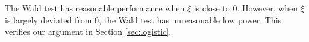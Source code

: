 \documentclass[11pt]{article}
\newcommand{\myT}{\intercal}
\theoremstyle{plain}
\theoremstyle{definition}
\theoremstyle{remark}
\begin{document}
The Wald test has reasonable performance when $\xi$ is close to $0$.
However, when $\xi$ is largely deviated from $0$, the Wald test has unreasonable low power.
This verifies our argument in Section \ref{sec:logistic}.
\end{document}
